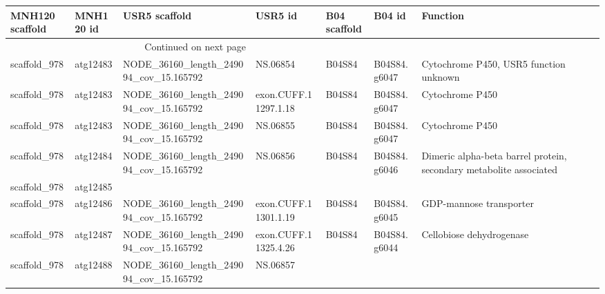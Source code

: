 \begin{longtable}{lllllll}
\toprule
MNH120 scaffold & MNH120 id &                           USR5 scaffold &               USR5 id & B04 scaffold &        B04 id &                                                                                  Function\\
\midrule
\endhead
\midrule
\multicolumn{3}{r}{{Continued on next page}} \\
\midrule
\endfoot

\bottomrule
\endlastfoot 
   scaffold\_978 &  atg12483 &  NODE\_36160\_length\_249094\_cov\_15.165792 &              NS.06854 &       B04S84 &  B04S84.g6047 &                                                            Cytochrome P450, USR5 function unknown\\
   scaffold\_978 &  atg12483 &  NODE\_36160\_length\_249094\_cov\_15.165792 &  exon.CUFF.11297.1.18 &       B04S84 &  B04S84.g6047 &                                                                                  Cytochrome P450 \\
   scaffold\_978 &  atg12483 &  NODE\_36160\_length\_249094\_cov\_15.165792 &              NS.06855 &       B04S84 &  B04S84.g6047 &                                                                                  Cytochrome P450 \\
   scaffold\_978 &  atg12484 &  NODE\_36160\_length\_249094\_cov\_15.165792 &              NS.06856 &       B04S84 &  B04S84.g6046 &                               Dimeric alpha-beta barrel protein, secondary metabolite associated \\
   scaffold\_978 &  atg12485 &                                         &                       &              &               &                                                                                                  &    \\
   scaffold\_978 &  atg12486 &  NODE\_36160\_length\_249094\_cov\_15.165792 &  exon.CUFF.11301.1.19 &       B04S84 &  B04S84.g6045 &                                                                          GDP-mannose transporter \\
   scaffold\_978 &  atg12487 &  NODE\_36160\_length\_249094\_cov\_15.165792 &  exon.CUFF.11325.4.26 &       B04S84 &  B04S84.g6044 &                                                                         Cellobiose dehydrogenase \\
   scaffold\_978 &  atg12488 &  NODE\_36160\_length\_249094\_cov\_15.165792 &              NS.06857 &              &               &                                                                                                  \\

\end{longtable}
